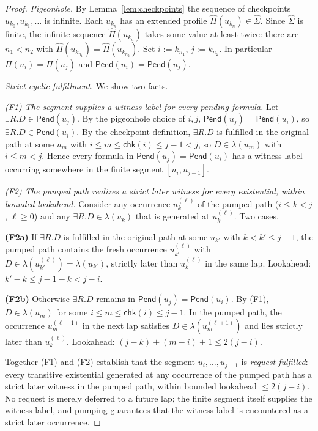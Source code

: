 \documentclass[11pt]{article}
\begin{document}
\begin{proof}
\emph{Pigeonhole.}  By Lemma~\ref{lem:checkpoints} the sequence of
checkpoints $u_{k_0},u_{k_1},\ldots$ is infinite.  Each $u_{k_n}$
has an extended profile $\widehat\Pi(u_{k_n})\in\widehat\Sigma$.
Since $\widehat\Sigma$ is finite, the infinite sequence
$\widehat\Pi(u_{k_n})$ takes some value at least twice: there are
$n_1<n_2$ with $\widehat\Pi(u_{k_{n_1}})=\widehat\Pi(u_{k_{n_2}})$.
Set $i:=k_{n_1}$, $j:=k_{n_2}$.  In particular
$\Pi(u_i)=\Pi(u_j)$ and $\mathsf{Pend}(u_i)=\mathsf{Pend}(u_j)$.

\emph{Strict cyclic fulfillment.}  We show two facts.

\smallskip\noindent\emph{(F1) The segment supplies a witness label
for every pending formula.}  Let $\exists R.D\in\mathsf{Pend}(u_j)$.
By the pigeonhole choice of $i,j$, $\mathsf{Pend}(u_j)=
\mathsf{Pend}(u_i)$, so $\exists R.D\in\mathsf{Pend}(u_i)$.  By the
checkpoint definition, $\exists R.D$ is fulfilled in the original
path at some $u_m$ with $i\le m\le\mathsf{chk}(i)\le j-1<j$, so
$D\in\lambda(u_m)$ with $i\le m<j$.  Hence every formula in
$\mathsf{Pend}(u_j)=\mathsf{Pend}(u_i)$ has a witness label
occurring somewhere in the finite segment $[u_i,u_{j-1}]$.

\smallskip\noindent\emph{(F2) The pumped path realizes a strict
later witness for every existential, within bounded lookahead.}
Consider any occurrence $u_k^{(\ell)}$ of the pumped path
($i\le k<j$, $\ell\ge 0$) and any $\exists R.D\in\lambda(u_k)$ that
is generated at $u_k^{(\ell)}$.  Two cases.

\textbf{(F2a)} If $\exists R.D$ is fulfilled in the original path at
some $u_{k'}$ with $k<k'\le j-1$, the pumped path contains the
fresh occurrence $u_{k'}^{(\ell)}$ with $D\in\lambda(u_{k'}^{(\ell)})=
\lambda(u_{k'})$, strictly later than $u_k^{(\ell)}$ in the same lap.
Lookahead: $k'-k\le j-1-k< j-i$.

\textbf{(F2b)} Otherwise $\exists R.D$ remains in
$\mathsf{Pend}(u_j)=\mathsf{Pend}(u_i)$.  By (F1), $D\in\lambda(u_m)$
for some $i\le m\le\mathsf{chk}(i)\le j-1$.  In the pumped path, the
occurrence $u_m^{(\ell+1)}$ in the next lap satisfies
$D\in\lambda(u_m^{(\ell+1)})$ and lies strictly later than
$u_k^{(\ell)}$.  Lookahead: $(j-k)+(m-i)+1\le 2(j-i)$.

\smallskip\noindent
Together (F1) and (F2) establish that the segment
$u_i,\ldots,u_{j-1}$ is \emph{request-fulfilled}: every transitive
existential generated at any occurrence of the pumped path has a
strict later witness in the pumped path, within bounded lookahead
$\le 2(j-i)$.  No request is merely deferred to a future lap; the
finite segment itself supplies the witness label, and pumping
guarantees that the witness label is encountered as a strict later
occurrence.


\end{proof}
\end{document}

